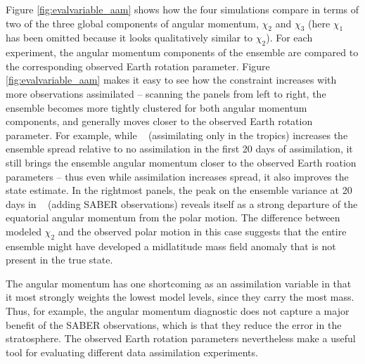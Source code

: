 Figure \ref{fig:evalvariable_aam} shows how the four simulations compare in terms of two of the three global components of angular momentum, $\chi_2$ and $\chi_3$ (here $\chi_1$ has been omitted because it looks qualitatively similar to $\chi_2$).  
For each experiment, the angular momentum components of the ensemble are compared  to the corresponding observed Earth rotation parameter. 
Figure  \ref{fig:evalvariable_aam} makes it easy to see how the constraint increases with more observations assimilated -- scanning the panels from left to right, the ensemble becomes more tightly clustered for both angular momentum components, and generally moves closer to the observed Earth rotation parameter. 
For example, while \WACCMTROPICS~ (assimilating only in the tropics) increases the ensemble spread relative to no assimilation in the first 20 days of assimilation, it still brings the ensemble angular momentum closer to the observed Earth roation parameters -- thus even while assimilation increases spread, it also improves the state estimate. 
In the rightmost panels, the peak on the ensemble variance at 20 days in \NCARFULL~ (adding SABER observations) reveals itself as a strong departure of the equatorial angular momentum from the polar motion.   
The difference between modeled $\chi_2$ and the observed polar motion in this case suggests that the entire ensemble might have developed a midlatitude mass field anomaly that is not present in the true state. 

The angular momentum has one shortcoming as an assimilation variable in that it most strongly weights the lowest model levels, since they carry the most mass. 
Thus, for example, the angular momentum diagnostic does not capture a major benefit of the SABER observations, which is that they reduce the error in the stratosphere. 
The observed Earth rotation parameters nevertheless make a useful tool for evaluating different data assimilation experiments. 
